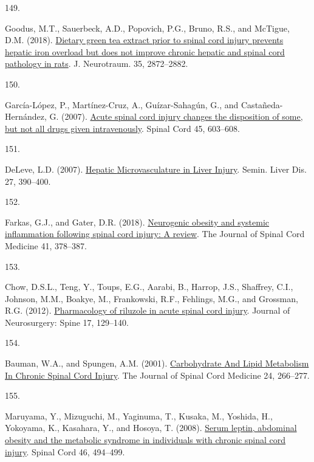 \documentclass[
]{article}
\newlength{\cslhangindent}
\newlength{\csllabelwidth}
\newlength{\cslentryspacingunit} %
\newenvironment{CSLReferences}[2] %
 {%
  \setlength{\parindent}{0pt}
  \ifodd #1
  \let\oldpar\par
  \def\par{\hangindent=\cslhangindent\oldpar}
  \fi
  \setlength{\parskip}{#2\cslentryspacingunit}
 }%
 {}
\newcommand{\CSLLeftMargin}[1]{\parbox[t]{\csllabelwidth}{#1}}
\newcommand{\CSLRightInline}[1]{\parbox[t]{\linewidth - \csllabelwidth}{#1}\break}
\begin{document}
\begin{CSLReferences}{0}{0}
\leavevmode{}%
\CSLLeftMargin{149. }
\CSLRightInline{Goodus, M.T., Sauerbeck, A.D., Popovich, P.G., Bruno, R.S., and McTigue, D.M. (2018). \href{https://doi.org/10.1089/neu.2018.5771}{Dietary green tea extract prior to spinal cord injury prevents hepatic iron overload but does not improve chronic hepatic and spinal cord pathology in rats}. J. Neurotraum. 35, 2872--2882.}

\leavevmode{}%
\CSLLeftMargin{150. }
\CSLRightInline{García-López, P., Martínez-Cruz, A., Guízar-Sahagún, G., and Castañeda-Hernández, G. (2007). \href{https://doi.org/10.1038/sj.sc.3102001}{Acute spinal cord injury changes the disposition of some, but not all drugs given intravenously}. Spinal Cord 45, 603--608.}

\leavevmode{}%
\CSLLeftMargin{151. }
\CSLRightInline{DeLeve, L.D. (2007). \href{https://doi.org/10.1055/s-2007-991515}{Hepatic {Microvasculature} in {Liver Injury}}. Semin. Liver Dis. 27, 390--400.}

\leavevmode{}%
\CSLLeftMargin{152. }
\CSLRightInline{Farkas, G.J., and Gater, D.R. (2018). \href{https://doi.org/10.1080/10790268.2017.1357104}{Neurogenic obesity and systemic inflammation following spinal cord injury: {A} review}. The Journal of Spinal Cord Medicine 41, 378--387.}

\leavevmode{}%
\CSLLeftMargin{153. }
\CSLRightInline{Chow, D.S.L., Teng, Y., Toups, E.G., Aarabi, B., Harrop, J.S., Shaffrey, C.I., Johnson, M.M., Boakye, M., Frankowski, R.F., Fehlings, M.G., and Grossman, R.G. (2012). \href{https://doi.org/10.3171/2012.5.AOSPINE12112}{Pharmacology of riluzole in acute spinal cord injury}. Journal of Neurosurgery: Spine 17, 129--140.}

\leavevmode{}%
\CSLLeftMargin{154. }
\CSLRightInline{Bauman, W.A., and Spungen, A.M. (2001). \href{https://doi.org/10.1080/10790268.2001.11753584}{Carbohydrate {And Lipid Metabolism In Chronic Spinal Cord Injury}}. The Journal of Spinal Cord Medicine 24, 266--277.}

\leavevmode{}%
\CSLLeftMargin{155. }
\CSLRightInline{Maruyama, Y., Mizuguchi, M., Yaginuma, T., Kusaka, M., Yoshida, H., Yokoyama, K., Kasahara, Y., and Hosoya, T. (2008). \href{https://doi.org/10.1038/sj.sc.3102171}{Serum leptin, abdominal obesity and the metabolic syndrome in individuals with chronic spinal cord injury}. Spinal Cord 46, 494--499.}


\end{CSLReferences}
\end{document}
